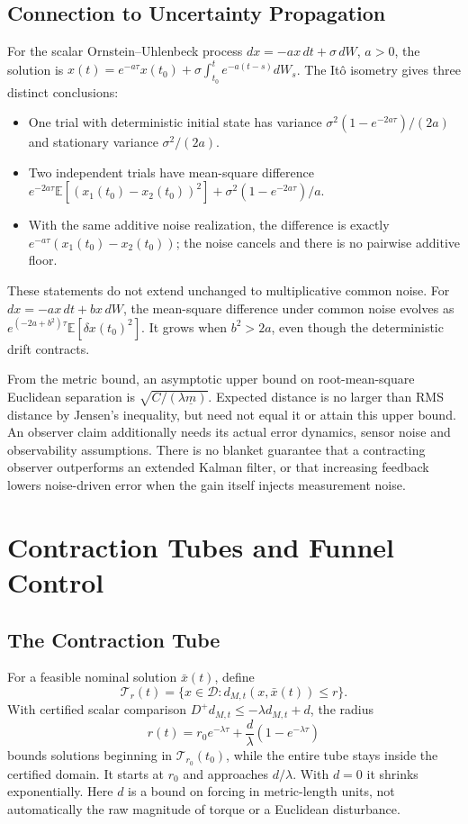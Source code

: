 \subsection{Connection to Uncertainty Propagation}

For the scalar Ornstein--Uhlenbeck process $dx=-ax\,dt+\sigma\,dW$, $a>0$, the solution is
$x(t)=e^{-a\tau}x(t_0)+\sigma\int_{t_0}^te^{-a(t-s)}dW_s$.
The It\^o isometry gives three distinct conclusions:
\begin{itemize}
\item One trial with deterministic initial state has variance $\sigma^2(1-e^{-2a\tau})/(2a)$ and stationary variance $\sigma^2/(2a)$.
\item Two independent trials have mean-square difference $e^{-2a\tau}\mathbb E[(x_1(t_0)-x_2(t_0))^2]+\sigma^2(1-e^{-2a\tau})/a$.
\item With the same additive noise realization, the difference is exactly $e^{-a\tau}(x_1(t_0)-x_2(t_0))$; the noise cancels and there is no pairwise additive floor.
\end{itemize}
These statements do not extend unchanged to multiplicative common noise. For $dx=-ax\,dt+bx\,dW$, the mean-square difference under common noise evolves as $e^{(-2a+b^2)\tau}\mathbb E[\delta x(t_0)^2]$. It grows when $b^2>2a$, even though the deterministic drift contracts.

From the metric bound, an asymptotic upper bound on root-mean-square Euclidean separation is $\sqrt{C/(\lambda\underline m)}$. Expected distance is no larger than RMS distance by Jensen's inequality, but need not equal it or attain this upper bound. An observer claim additionally needs its actual error dynamics, sensor noise and observability assumptions. There is no blanket guarantee that a contracting observer outperforms an extended Kalman filter, or that increasing feedback lowers noise-driven error when the gain itself injects measurement noise.

\section{Contraction Tubes and Funnel Control}

\subsection{The Contraction Tube}

For a feasible nominal solution $\bar x(t)$, define
\begin{equation}
\mathcal T_r(t)=\{x\in\mathcal D:d_{M,t}(x,\bar x(t))\leq r\}.
\label{eq:ch4:tube}
\end{equation}
With certified scalar comparison $D^+d_{M,t}\leq-\lambda d_{M,t}+d$, the radius
\begin{equation}
r(t)=r_0e^{-\lambda\tau}+\frac d\lambda(1-e^{-\lambda\tau})
\end{equation}
bounds solutions beginning in $\mathcal T_{r_0}(t_0)$, while the entire tube stays inside the certified domain. It starts at $r_0$ and approaches $d/\lambda$. With $d=0$ it shrinks exponentially. Here $d$ is a bound on forcing in metric-length units, not automatically the raw magnitude of torque or a Euclidean disturbance.

